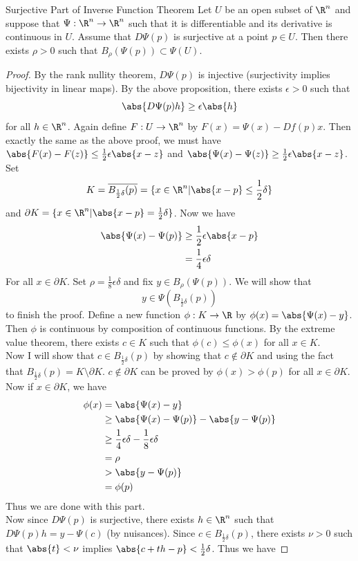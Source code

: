\documentclass[a4paper]{article}
\begin{document}
\begin{prp}{Surjective Part of Inverse Function Theorem}{} Let $U$ be an open subset of $\R^n$ and suppose that $\Psi:\R^n\to\R^n$ such that it is differentiable and its derivative is continuous in $U$. Assume that $D\Psi(p)$ is surjective at a point $p\in U$. Then there exists $\rho>0$ such that $B_\rho(\Psi(p))\subset\Psi(U)$. 
\begin{proof}
By the rank nullity theorem, $D\Psi(p)$ is injective (surjectivity implies bijectivity in linear maps). By the above proposition, there exists $\epsilon>0$ such that $$\abs{D\Psi(p)h}\geq\epsilon\abs{h}$$ for all $h\in\R^n$. Again define $F:U\to\R^n$ by $F(x)=\Psi(x)-Df(p)x$. Then exactly the same as the above proof, we must have $\abs{F(x)-F(z)}\leq\frac{1}{2}\epsilon\abs{x-z}$ and $\abs{\Psi(x)-\Psi(z)}\geq\frac{1}{2}\epsilon\abs{x-z}$. Set $$K=\overline{B_{\frac{1}{2}\delta}(p)}=\{x\in\R^n|\abs{x-p}\leq\frac{1}{2}\delta\}$$ and $\partial K=\{x\in\R^n|\abs{x-p}=\frac{1}{2}\delta\}$. 
Now we have 
\begin{align*}
\abs{\Psi(x)-\Psi(p)}&\geq\frac{1}{2}\epsilon\abs{x-p}\\
&=\frac{1}{4}\epsilon\delta
\end{align*}
For all $x\in\partial K$. Set $\rho=\frac{1}{8}\epsilon\delta$ and fix $y\in B_\rho(\Psi(p))$. We will show that $$y\in\Psi(B_{\frac{1}{2}\delta}(p))$$ to finish the proof. Define a new function $\phi:K\to \R$ by $\phi(x)=\abs{\Psi(x)-y}$. Then $\phi$ is continuous by composition of continuous functions. By the extreme value theorem, there exists $c\in K$ such that $\phi(c)\leq\phi(x)$ for all $x\in K$. \\
Now I will show that $c\in B_{\frac{1}{2}\delta}(p)$ by showing that $c\notin\partial K$ and using the fact that $B_{\frac{1}{2}\delta}(p)=K\setminus\partial{K}$. $c\notin\partial K$ can be proved by $\phi(x)>\phi(p)$ for all $x\in\partial K$. Now if $x\in\partial K$, we have
\begin{align*}
\phi(x)&=\abs{\Psi(x)-y}\\
&\geq\abs{\Psi(x)-\Psi(p)}-\abs{y-\Psi(p)}\\
&\geq\frac{1}{4}\epsilon\delta-\frac{1}{8}\epsilon\delta\\
&=\rho\\
&>\abs{y-\Psi(p)}\\
&=\phi(p)
\end{align*}
Thus we are done with this part. \\
Now since $D\Psi(p)$ is surjective, there exists $h\in\R^n$ such that $D\Psi(p)h=y-\Psi(c)$ (by nuisances). Since $c\in B_{\frac{1}{2}\delta}(p)$, there exists $\nu>0$ such that $\abs{t}<\nu$ implies $\abs{c+th-p}<\frac{1}{2}\delta$. Thus we have 

\end{proof}
\end{prp}
\end{document}
